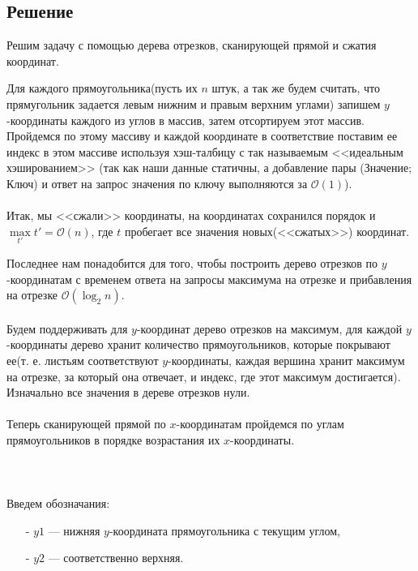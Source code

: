 \documentclass{article}
\begin{document}
\subsection*{Решение}

Решим задачу с помощью дерева отрезков, сканирующей прямой и сжатия координат.

Для каждого прямоугольника(пусть их $n$ штук, а так же будем считать, что прямугольник задается левым нижним и правым верхним углами) запишем $y$-координаты каждого из углов в массив, затем отсортируем этот массив. Пройдемся по этому массиву и каждой координате в соответствие поставим ее индекс в этом массиве используя хэш-талбицу с так называемым <<идеальным хэшированием>> (так как наши данные статичны, а добавление пары (Значение; Ключ) и ответ на запрос значения по ключу выполняются за $\mathcal{O}(1)$). 
\\\\
Итак, мы <<сжали>> координаты, на координатах сохранился порядок и $\max\limits_{t'}{t'} = \mathcal{O}(n)$, где $t$ пробегает все значения новых(<<сжатых>>) координат. 

Последнее нам понадобится для того, чтобы построить дерево отрезков по $y$-координатам с временем ответа на запросы максимума на отрезке и прибавления на отрезке $\mathcal{O}(\log_{2}n)$.
\\\\
Будем поддерживать для $y$-координат дерево отрезков на максимум, для каждой $y$-координаты дерево хранит количество  прямоугольников, которые покрывают ее(т. е. листьям соответствуют $y$-координаты, каждая вершина хранит максимум на отрезке, за который она отвечает, и индекс, где этот максимум достигается). Изначально все значения в дереве отрезков нули.
\\\\
Теперь сканирующей прямой по $x$-координатам пройдемся по углам прямоугольников в порядке возрастания их $x$-координаты. 
\\\\
\\\\
Введем обозначания:
\begin{itemize}
\item[-]
$y1$ --- нижняя $y$-координата прямоугольника с текущим углом,
\item[-]
$y2$ --- соответственно верхняя. 
\end{itemize}
\end{document}
